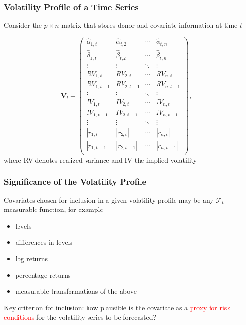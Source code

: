 \documentclass[9pt]{beamer}
\newcommand{\V}{\textbf{V}}
\theoremstyle{definition}
\begin{document}
\begin{frame}
\frametitle{Volatility Profile of a Time Series}
\fontsize{6.6}{7}

Consider the $p \times n$ matrix that stores donor and covariate information at time $t$

\begin{equation*}
    \V_{t} = 
    \begin{pmatrix}
    \hat\alpha_{1,t} & \hat\alpha_{t,2}  & \cdots & \hat\alpha_{t,n}  \\
    \hat\beta_{1,t} & \hat\beta_{t,2}  & \cdots & \hat\beta_{t,n}  \\
    \vdots  & \vdots  & \ddots & \vdots  \\
    RV_{1,t} & RV_{2,t}  & \cdots & RV_{n,t}  \\
    RV_{1,t-1}  & RV_{2,t-1}  & \cdots & RV_{n,t-1}  \\
    \vdots  & \vdots  & \ddots & \vdots  \\
    IV_{1,t} & IV_{2,t} & \cdots & IV_{n,t} \\
    IV_{1,t-1}  & IV_{2,t-1}  & \cdots & IV_{n,t-1} \\
    \vdots  & \vdots  & \ddots & \vdots  \\
    |r_{1,t}| & |r_{2,t}| & \cdots & |r_{n,t}| \\
    |r_{1,t-1}|  & |r_{2,t-1}|  & \cdots & |r_{n,t-1}| \\
    \end{pmatrix},
    \end{equation*}
    \bigbreak
    where RV denotes realized variance and IV the implied volatility
\end{frame}

\begin{frame}
    \frametitle{Significance of the Volatility Profile}
    Covariates chosen for inclusion in a given volatility profile may be any $\mathcal{F}_{t}$-measurable function, for example
    \begin{itemize}
        \item levels
        \item differences in levels
        \item log returns
        \item percentage returns
        \item measurable transformations of the above
    \end{itemize}

    \bigbreak 

    Key criterion for inclusion: how plausible is the covariate as a \textcolor{red}{proxy for risk conditions} for the volatility series to be forecasted?
\end{frame}
\end{document}

